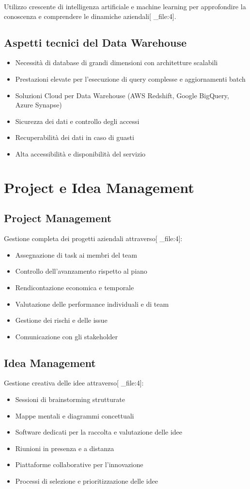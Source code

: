 \documentclass[12pt,a4paper]{article}
\begin{document}
Utilizzo crescente di intelligenza artificiale e machine learning per approfondire la conoscenza e comprendere le dinamiche aziendali[ _file:4].

\subsection{Aspetti tecnici del Data Warehouse}
\begin{itemize}
    \item Necessità di database di grandi dimensioni con architetture scalabili
    \item Prestazioni elevate per l'esecuzione di query complesse e aggiornamenti batch
    \item Soluzioni Cloud per Data Warehouse (AWS Redshift, Google BigQuery, Azure Synapse)
    \item Sicurezza dei dati e controllo degli accessi
    \item Recuperabilità dei dati in caso di guasti
    \item Alta accessibilità e disponibilità del servizio
\end{itemize}

\section{Project e Idea Management}

\subsection{Project Management}
Gestione completa dei progetti aziendali attraverso[ _file:4]:
\begin{itemize}
    \item Assegnazione di task ai membri del team
    \item Controllo dell'avanzamento rispetto al piano
    \item Rendicontazione economica e temporale
    \item Valutazione delle performance individuali e di team
    \item Gestione dei rischi e delle issue
    \item Comunicazione con gli stakeholder
\end{itemize}

\subsection{Idea Management}
Gestione creativa delle idee attraverso[ _file:4]:
\begin{itemize}
    \item Sessioni di brainstorming strutturate
    \item Mappe mentali e diagrammi concettuali
    \item Software dedicati per la raccolta e valutazione delle idee
    \item Riunioni in presenza e a distanza
    \item Piattaforme collaborative per l'innovazione
    \item Processi di selezione e prioritizzazione delle idee
\end{itemize}
\end{document}
